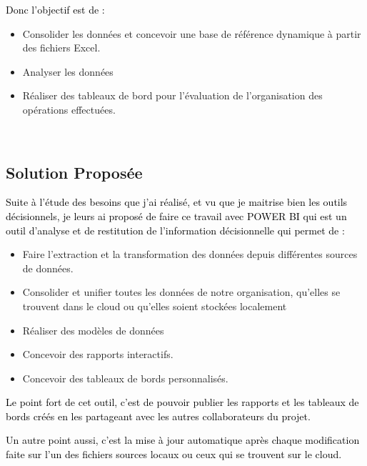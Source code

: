 \textcolor{black}{Donc l’objectif est de :}

\begin{itemize}
	\item Consolider les données et concevoir une base de référence dynamique à partir des fichiers Excel.
	\item Analyser les données
	\item Réaliser des tableaux de bord pour l'évaluation de l'organisation des opérations effectuées.
\end{itemize}
~~\\ 
 	
\subsection*{Solution Proposée}

\textcolor{black}{Suite à l’étude des besoins que j’ai réalisé, et vu que je maitrise bien les outils décisionnels, je leurs ai proposé de faire ce travail avec POWER BI qui est un outil d’analyse et de restitution de l’information décisionnelle qui permet de :}



\begin{itemize}
	\item Faire l’extraction et la transformation des données depuis différentes sources de données.
	\item Consolider et unifier toutes les données de notre organisation, qu’elles se trouvent dans le cloud ou qu’elles soient stockées localement
	\item Réaliser des modèles de données
	\item Concevoir des rapports interactifs.
	\item Concevoir des tableaux de bords personnalisés.
\end{itemize}


\textcolor{black}{Le point fort de cet outil, c’est de pouvoir publier les rapports et les tableaux de bords créés en les partageant avec les autres collaborateurs du projet.}

\textcolor{black}{Un autre point aussi, c’est la mise à jour automatique après chaque modification faite sur l’un des fichiers sources locaux ou ceux qui se trouvent sur le cloud.}

